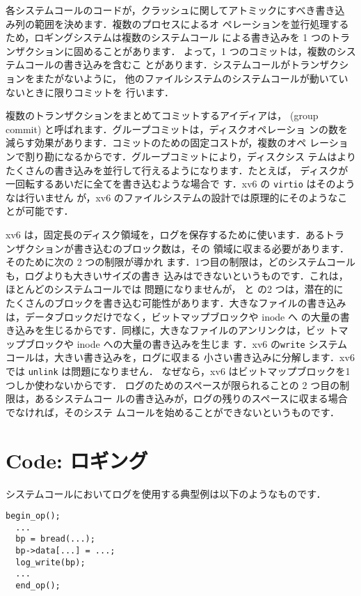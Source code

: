 各システムコールのコードが，クラッシュに関してアトミックにすべき書き込
み列の範囲を決めます．複数のプロセスによるオ
ペレーションを並行処理するため，ロギングシステムは複数のシステムコール
による書き込みを 1 つのトランザクションに固めることがあります．
よって，1 つのコミットは，複数のシステムコールの書き込みを含むこ
とがあります．システムコールがトランザクションをまたがないように，
他のファイルシステムのシステムコールが動いていないときに限りコミットを
行います．

複数のトランザクションをまとめてコミットするアイディアは，
 (group commit) と呼ばれます．グループコミットは，ディスクオペレーショ
ンの数を減らす効果があります．コミットのための固定コストが，複数のオペ
レーションで割り勘になるからです．グループコミットにより，ディスクシス
テムはよりたくさんの書き込みを並行して行えるようになります．たとえば，
ディスクが一回転するあいだに全てを書き込むような場合で
す．xv6 の \texttt{virtio} はそのようなは行いません
が，xv6 のファイルシステムの設計では原理的にそのようなことが可能です．

xv6 は，固定長のディスク領域を，ログを保存するために使います．あるトラ
ンザクションが書き込むのブロック数は，その
領域に収まる必要があります．そのために次の 2 つの制限が導かれ
ます．1つ目の制限は，どのシステムコールも，ログよりも大きいサイズの書き
込みはできないというものです．これは，ほとんどのシステムコールでは
問題になりませんが， と  の2 つは，潜在的に
たくさんのブロックを書き込む可能性があります．大きなファイルの書き込み
は，データブロックだけでなく，ビットマップブロックや inode へ
の大量の書き込みを生じるからです．同様に，大きなファイルのアンリンクは，ビッ
トマップブロックや inode への大量の書き込みを生じま
す．xv6 の\texttt{write} システムコールは，大きい書き込みを，ログに収まる
小さい書き込みに分解します．xv6 では \texttt{unlink} は問題になりません．
なぜなら，xv6 はビットマップブロックを1つしか使わないからです．
ログのためのスペースが限られることの 2 つ目の制限は，あるシステムコー
ルの書き込みが，ログの残りのスペースに収まる場合でなければ，そのシステ
ムコールを始めることができないというものです．

\section{Code: ロギング}

システムコールにおいてログを使用する典型例は以下のようなものです．
\begin{lstlisting}[]
  begin_op();
  ...
  bp = bread(...);
  bp->data[...] = ...;
  log_write(bp);
  ...
  end_op();
\end{lstlisting}

